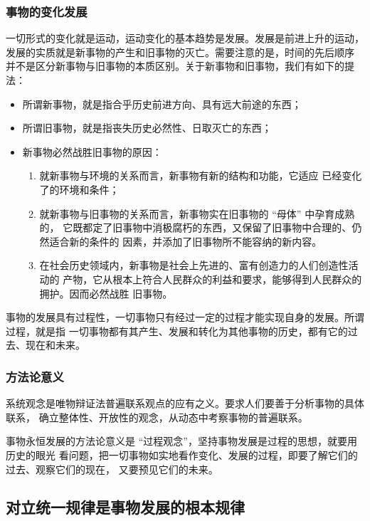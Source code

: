 \documentclass[11pt, UTF8]{book} %
\begin{document}
\subsubsection{事物的变化发展}

一切形式的变化就是运动，运动变化的基本趋势是发展。发展是前进上升的运动，
发展的实质就是新事物的产生和旧事物的灭亡。需要注意的是，时间的先后顺序
并不是区分新事物与旧事物的本质区别。关于新事物和旧事物，我们有如下的提法：
\begin{itemize}[itemsep=0pt]
    \item 所谓新事物，就是指合乎历史前进方向、具有远大前途的东西；
    \item 所谓旧事物，就是指丧失历史必然性、日取灭亡的东西；
    \item 新事物必然战胜旧事物的原因：
    \begin{enumerate}[label={${\arabic*}^\circ$}, itemsep=0pt]
        \item 就新事物与环境的关系而言，新事物有新的结构和功能，它适应
        已经变化了的环境和条件；
        \item 就新事物与旧事物的关系而言，新事物实在旧事物的 “母体” 中孕育成熟的，
        它既都定了旧事物中消极腐朽的东西，又保留了旧事物中合理的、仍然适合新的条件的
        因素，并添加了旧事物所不能容纳的新内容。
        \item 在社会历史领域内，新事物是社会上先进的、富有创造力的人们创造性活动的
        产物，它从根本上符合人民群众的利益和要求，能够得到人民群众的拥护。因而必然战胜
        旧事物。
    \end{enumerate}
\end{itemize}
事物的发展具有过程性，一切事物只有经过一定的过程才能实现自身的发展。所谓过程，就是指
一切事物都有其产生、发展和转化为其他事物的历史，都有它的过去、现在和未来。

\subsubsection{方法论意义}

系统观念是唯物辩证法普遍联系观点的应有之义。要求人们要善于分析事物的具体联系，
确立整体性、开放性的观念，从动态中考察事物的普遍联系。

事物永恒发展的方法论意义是 “过程观念”，坚持事物发展是过程的思想，就要用历史的眼光
看问题，把一切事物如实地看作变化、发展的过程，即要了解它们的过去、观察它们的现在，
又要预见它们的未来。

\subsection{对立统一规律是事物发展的根本规律}
\end{document}
